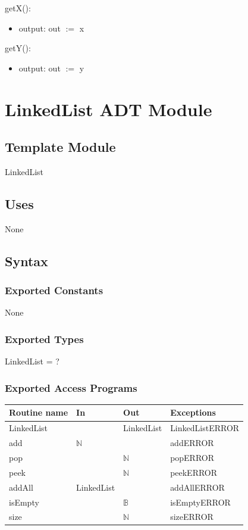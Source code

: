 \documentclass[12pt]{article}
\begin{document}
\noindent getX():
\begin{itemize}
  \item output: out $:=$ x
\end{itemize}


\noindent getY():
\begin{itemize}
  \item output: out $:=$ y
\end{itemize}

\newpage

\section* {LinkedList ADT Module}

\subsection*{Template Module}

LinkedList

\subsection* {Uses}

None

\subsection* {Syntax}

\subsubsection* {Exported Constants}

None

\subsubsection* {Exported Types}

LinkedList = ?

\medskip

\subsubsection* {Exported Access Programs}

\begin{tabular}{| l | l | l | p{6cm} |}
\hline
\textbf{Routine name} & \textbf{In} & \textbf{Out} & \textbf{Exceptions}\\
\hline
LinkedList & ~ & LinkedList &  LinkedListERROR\\
\hline
add & $\mathbb{N}$ & ~ &  addERROR\\
\hline
pop & ~ & $\mathbb{N}$ &  popERROR\\
\hline
peek & ~ & $\mathbb{N}$ &  peekERROR\\
\hline
addAll & LinkedList & ~ &  addAllERROR\\
\hline
isEmpty & ~ & $\mathbb{B}$ & isEmptyERROR\\
\hline
size & ~ & $\mathbb{N}$ &  sizeERROR\\
\hline
\end{tabular}
\end{document}
